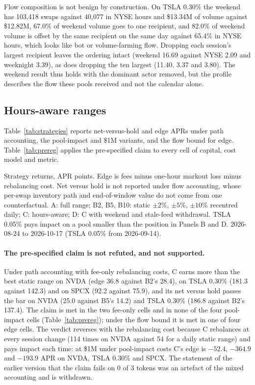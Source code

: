 \documentclass[11pt]{article}
\newcommand{\USD}{\$}
\newcommand{\tabfit}[1]{\begin{adjustbox}{max width=\linewidth,center}\small\end{adjustbox}}
\begin{document}
Flow composition is not benign by construction. On TSLA 0.30\% the weekend has 103,418 swaps against 40,077 in NYSE hours and \USD13.34M of volume against \USD12.82M, 67.0\% of weekend volume goes to one recipient, and 82.0\% of weekend volume is offset by the same recipient on the same day against 65.4\% in NYSE hours, which looks like bot or volume-farming flow. Dropping each session's largest recipient leaves the ordering intact (weekend 16.69 against NYSE 2.09 and weeknight 3.39), as does dropping the ten largest (11.40, 3.37 and 3.80). The weekend result thus holds with the dominant actor removed, but the profile describes the flow these pools received and not the calendar alone.

\subsection{Hours-aware ranges}\label{sec:res:ranges}

Table~\ref{tab:strategies} reports net-versus-hold and edge APRs under path accounting, the pool-impact and \USD1M variants, and the flow bound for edge. Table~\ref{tab:prereg} applies the pre-specified claim to every cell of capital, cost model and metric.

\begin{table}[!tbp]
\centering
\caption{Strategy returns, APR points. Edge is fees minus one-hour markout loss minus rebalancing cost. Net versus hold is not reported under flow accounting, whose per-swap inventory path and end-of-window value do not come from one counterfactual. A: full range; B2, B5, B10: static $\pm2\%$, $\pm5\%$, $\pm10\%$ recentred daily; C: hours-aware; D: C with weekend and stale-feed withdrawal. TSLA 0.05\% pays impact on a pool smaller than the position in Panels B and D. 2026-08-24 to 2026-10-17 (TSLA 0.05\% from 2026-09-14).}
\label{tab:strategies}
\tabfit{t_strategies.tex}
\end{table}

\paragraph{The pre-specified claim is not refuted, and not supported.} Under path accounting with fee-only rebalancing costs, C earns more than the best static range on NVDA (edge 36.8 against B2's 28.4), on TSLA 0.30\% (181.3 against 142.3) and on SPCX (92.2 against 75.9), and its net versus hold passes the bar on NVDA (25.0 against B5's 14.2) and TSLA 0.30\% (186.8 against B2's 137.4). The claim is met in the two fee-only cells and in none of the four pool-impact cells (Table~\ref{tab:prereg}); under the flow bound it is met in one of four edge cells. The verdict reverses with the rebalancing cost because C rebalances at every session change (114 times on NVDA against 54 for a daily static range) and pays impact each time: at \USD1M under pool-impact costs C's edge is $-52.4$, $-364.9$ and $-193.9$ APR on NVDA, TSLA 0.30\% and SPCX. The statement of the earlier version that the claim fails on 0 of 3 tokens was an artefact of the mixed accounting and is withdrawn.
\end{document}
